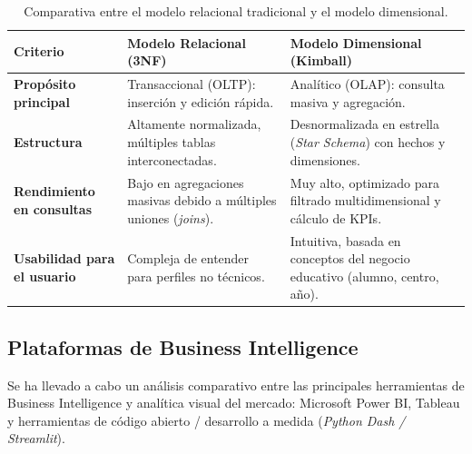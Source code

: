\documentclass[12pt, a4paper, twoside]{report}
\begin{document}
\begin{table}[h!]
\centering
\caption{Comparativa entre el modelo relacional tradicional y el modelo dimensional.}
\label{tab:comp_modelado}
\small
\begin{tabularx}{\textwidth}{@{} p{3.2cm} p{5.0cm} X @{}}
\toprule
\textbf{Criterio} & \textbf{Modelo Relacional (3NF)} & \textbf{Modelo Dimensional (Kimball)} \\ \midrule
\textbf{Propósito principal} & Transaccional (OLTP): inserción y edición rápida. & Analítico (OLAP): consulta masiva y agregación. \\ \addlinespace
\textbf{Estructura} & Altamente normalizada, múltiples tablas interconectadas. & Desnormalizada en estrella (\textit{Star Schema}) con hechos y dimensiones. \\ \addlinespace
\textbf{Rendimiento en consultas} & Bajo en agregaciones masivas debido a múltiples uniones (\textit{joins}). & Muy alto, optimizado para filtrado multidimensional y cálculo de KPIs. \\ \addlinespace
\textbf{Usabilidad para el usuario} & Compleja de entender para perfiles no técnicos. & Intuitiva, basada en conceptos del negocio educativo (alumno, centro, año). \\ \bottomrule
\end{tabularx}
\end{table}

\subsection{Plataformas de Business Intelligence}
Se ha llevado a cabo un análisis comparativo entre las principales herramientas de Business Intelligence y analítica visual del mercado: Microsoft Power BI, Tableau y herramientas de código abierto / desarrollo a medida (\textit{Python Dash / Streamlit}).
\end{document}
